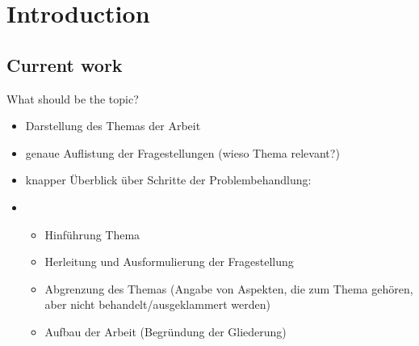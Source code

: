 \chapter{Introduction}

\section{Current work}
What should be the topic?
    \begin{itemize}
        \item Darstellung des Themas der Arbeit
        \item genaue Auflistung der Fragestellungen (wieso Thema relevant?)
        \item knapper Überblick über Schritte der Problembehandlung:
        \item 
            \begin{itemize}
                \item Hinführung Thema
                \item Herleitung und Ausformulierung der Fragestellung
                \item Abgrenzung des Themas (Angabe von Aspekten, die zum Thema gehören, aber nicht behandelt/ausgeklammert werden)
                \item Aufbau der Arbeit (Begründung der Gliederung)
            \end{itemize}
    \end{itemize}


